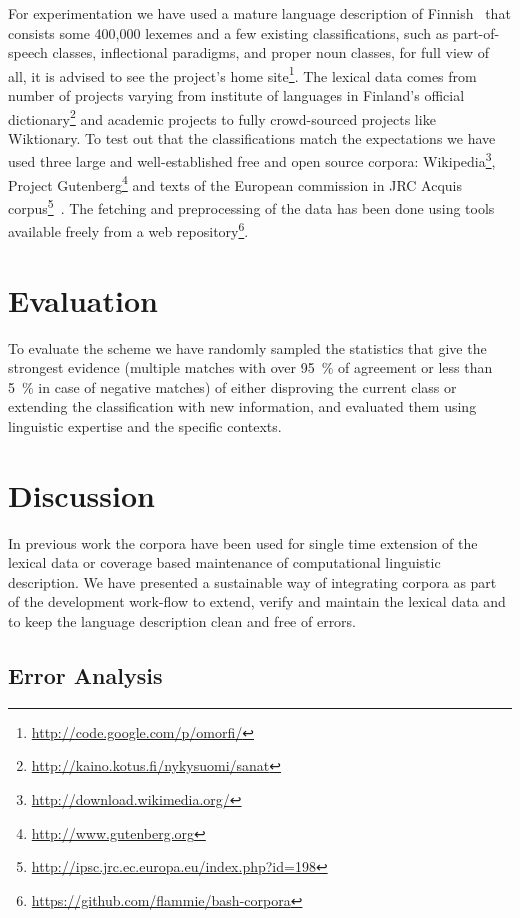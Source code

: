 \documentclass[a5paper]{article}
\begin{document}
For experimentation we have used a mature language description of
Finn\-ish~\cite{pirinen2008suomen} that consists some 400,000 lexemes and a few
existing classifications, such as part-of-speech classes, inflectional
paradigms, and proper noun classes, for full view of all, it is advised to see
the project's home site\footnote{\url{http://code.google.com/p/omorfi/}}. The
lexical data comes from number of projects varying from institute of languages
in Finland's official
dictionary\footnote{\url{http://kaino.kotus.fi/nykysuomi/sanat}} and academic
projects to fully crowd-sourced projects like Wiktionary. To test out that the
classifications match the expectations we have used three large and
well-established free and open source corpora:
Wikipedia\footnote{\url{http://download.wikimedia.org/}}, Project
Gutenberg\footnote{\url{http://www.gutenberg.org}} and texts of the European
commission in JRC Acquis
corpus\footnote{\url{http://ipsc.jrc.ec.europa.eu/index.php?id=198}}~\cite{steinberger2006jrc}.
The fetching and preprocessing of the data has been done using tools available
freely from a web
repository\footnote{\url{https://github.com/flammie/bash-corpora}}.

\section{Evaluation}

To evaluate the scheme we have randomly sampled the statistics that give the
strongest evidence (multiple matches with over 95~\% of agreement or less than 
5~\% in case of negative matches) of either
disproving the current class or extending the classification with new
information, and evaluated them using linguistic expertise and the specific
contexts. 

\section{Discussion}

In previous work the corpora have been used for single time extension of the
lexical data or coverage based maintenance of computational linguistic
description. We have presented a sustainable way of integrating corpora as part
of the development work-flow to extend, verify and maintain the lexical data
and to keep the language description clean and free of errors.

\subsection{Error Analysis}
\end{document}
